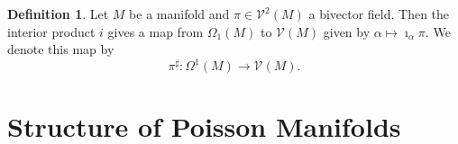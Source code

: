 \documentclass[psamsfonts,12pt]{amsart}
\newcommand\td{\mathrm{d}}
\newcommand\0{\mathbf{0}}
\theoremstyle{plain}
\theoremstyle{definition}
\newtheorem{dfn}[thm]{Definition} %
\newtheorem{rmk}[thm]{Remark}
\newcommand{\bbR}{\mathbb{R}}
\newcommand{\sV}{\mathcal{V}}
\begin{document}
\begin{dfn}
Let $M$ be a manifold and $\pi\in \sV^2(M)$ a bivector field.  Then the interior product $i$ gives a map from $\Omega_1(M)$ to $\sV(M)$ given by $\alpha \mapsto \imath_\alpha \pi$.  We denote this map by
\[
\pi^{\sharp}\colon \Omega^1(M)\rightarrow \sV(M).
\]
\end{dfn}


\section{Structure of Poisson Manifolds}





\end{document}
